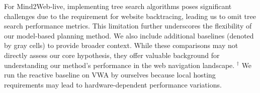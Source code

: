 \begin{table}[t]
{For Mind2Web-live, implementing tree search algorithms poses significant challenges due to the requirement for website backtracing, leading us to omit tree search performance metrics. 
This limitation further underscores the flexibility of our model-based planning method.
We also include additional baselines (denoted by \colorbox{gray!10}{gray} cells) to provide broader context. 
While these comparisons may not directly assess our core hypothesis, they offer valuable background for understanding our method's performance in the web navigation landscape.
$^\dagger$ We run the reactive baseline on VWA by ourselves because local hosting requirements may lead to hardware-dependent performance variations.
}
\label{tab:main}
\end{table}